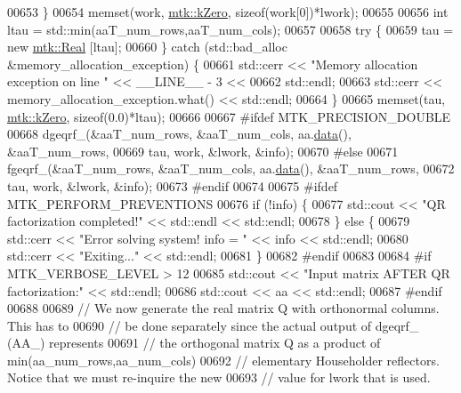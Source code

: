 \begin{DoxyCode}
00653   \}
00654   memset(work, \hyperlink{group__c01-roots_ga59a451a5fae30d59649bcda274fea271}{mtk::kZero}, \textcolor{keyword}{sizeof}(work[0])*lwork);
00655 
00656   \textcolor{keywordtype}{int} ltau = std::min(aaT\_num\_rows,aaT\_num\_cols);
00657 
00658   \textcolor{keywordflow}{try} \{
00659     tau = \textcolor{keyword}{new} \hyperlink{group__c01-roots_gac080bbbf5cbb5502c9f00405f894857d}{mtk::Real} [ltau];
00660   \} \textcolor{keywordflow}{catch} (std::bad\_alloc &memory\_allocation\_exception) \{
00661     std::cerr << \textcolor{stringliteral}{"Memory allocation exception on line "} << \_\_LINE\_\_ - 3 <<
00662       std::endl;
00663     std::cerr << memory\_allocation\_exception.what() << std::endl;
00664   \}
00665   memset(tau, \hyperlink{group__c01-roots_ga59a451a5fae30d59649bcda274fea271}{mtk::kZero}, \textcolor{keyword}{sizeof}(0.0)*ltau);
00666 
00667 \textcolor{preprocessor}{  #ifdef MTK\_PRECISION\_DOUBLE}
00668   dgeqrf\_(&aaT\_num\_rows, &aaT\_num\_cols, aa.\hyperlink{classmtk_1_1DenseMatrix_a0c33b8a9e01d157c61ddbdf807c25d84}{data}(), &aaT\_num\_rows,
00669           tau, work, &lwork, &info);
00670 \textcolor{preprocessor}{  #else}
00671   fgeqrf\_(&aaT\_num\_rows, &aaT\_num\_cols, aa.\hyperlink{classmtk_1_1DenseMatrix_a0c33b8a9e01d157c61ddbdf807c25d84}{data}(), &aaT\_num\_rows,
00672           tau, work, &lwork, &info);
00673 \textcolor{preprocessor}{  #endif}
00674 
00675 \textcolor{preprocessor}{  #ifdef MTK\_PERFORM\_PREVENTIONS}
00676   \textcolor{keywordflow}{if} (!info) \{
00677     std::cout << \textcolor{stringliteral}{"QR factorization completed!"} << std::endl << std::endl;
00678   \} \textcolor{keywordflow}{else} \{
00679     std::cerr << \textcolor{stringliteral}{"Error solving system! info = "} << info << std::endl;
00680     std::cerr << \textcolor{stringliteral}{"Exiting..."} << std::endl;
00681   \}
00682 \textcolor{preprocessor}{  #endif}
00683 
00684 \textcolor{preprocessor}{  #if MTK\_VERBOSE\_LEVEL > 12}
00685   std::cout << \textcolor{stringliteral}{"Input matrix AFTER QR factorization:"} << std::endl;
00686   std::cout << aa << std::endl;
00687 \textcolor{preprocessor}{  #endif}
00688 
00689   \textcolor{comment}{// We now generate the real matrix Q with orthonormal columns. This has to}
00690   \textcolor{comment}{// be done separately since the actual output of dgeqrf\_ (AA\_) represents}
00691   \textcolor{comment}{// the orthogonal matrix Q as a product of min(aa\_num\_rows,aa\_num\_cols)}
00692   \textcolor{comment}{// elementary Householder reflectors. Notice that we must re-inquire the new}
00693   \textcolor{comment}{// value for lwork that is used.}

\end{DoxyCode}
